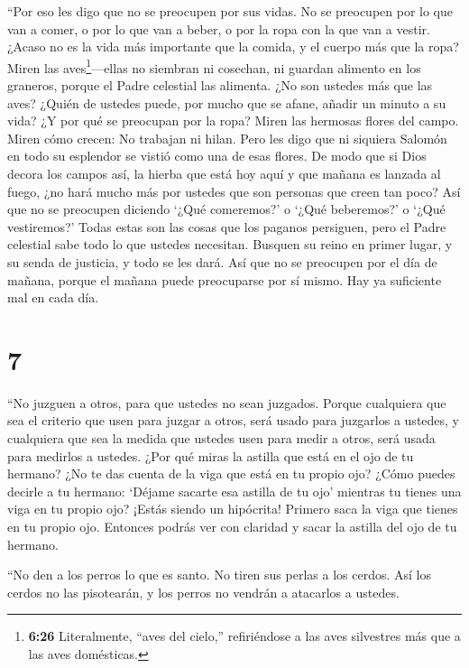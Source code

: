  ``Por eso les digo que no se preocupen por sus vidas. No
se preocupen por lo que van a comer, o por lo que van a beber, o por la
ropa con la que van a vestir. ¿Acaso no es la vida más importante que la
comida, y el cuerpo más que la ropa?  Miren las
aves\footnote{\textbf{6:26} Literalmente, ``aves del cielo,''
  refiriéndose a las aves silvestres más que a las aves domésticas.}---ellas
no siembran ni cosechan, ni guardan alimento en los graneros, porque el
Padre celestial las alimenta. ¿No son ustedes más que las aves?
 ¿Quién de ustedes puede, por mucho que se afane, añadir un
minuto a su vida?  ¿Y por qué se preocupan por la ropa?
Miren las hermosas flores del campo. Miren cómo crecen: No trabajan ni
hilan.  Pero les digo que ni siquiera Salomón en todo su
esplendor se vistió como una de esas flores.  De modo que
si Dios decora los campos así, la hierba que está hoy aquí y que mañana
es lanzada al fuego, ¿no hará mucho más por ustedes que son personas que
creen tan poco?  Así que no se preocupen diciendo `¿Qué
comeremos?' o `¿Qué beberemos?' o `¿Qué vestiremos?'  Todas
estas son las cosas que los paganos persiguen, pero el Padre celestial
sabe todo lo que ustedes necesitan.  Busquen su reino en
primer lugar, y su senda de justicia, y todo se les dará. 
Así que no se preocupen por el día de mañana, porque el mañana puede
preocuparse por sí mismo. Hay ya suficiente mal en cada día.

\hypertarget{section-6}{%
\section{7}\label{section-6}}

 ``No juzguen a otros, para que ustedes no sean juzgados.
 Porque cualquiera que sea el criterio que usen para juzgar
a otros, será usado para juzgarlos a ustedes, y cualquiera que sea la
medida que ustedes usen para medir a otros, será usada para medirlos a
ustedes.  ¿Por qué miras la astilla que está en el ojo de tu
hermano? ¿No te das cuenta de la viga que está en tu propio ojo?
 ¿Cómo puedes decirle a tu hermano: `Déjame sacarte esa
astilla de tu ojo' mientras tu tienes una viga en tu propio ojo?
 ¡Estás siendo un hipócrita! Primero saca la viga que tienes
en tu propio ojo. Entonces podrás ver con claridad y sacar la astilla
del ojo de tu hermano.

 ``No den a los perros lo que es santo. No tiren sus perlas
a los cerdos. Así los cerdos no las pisotearán, y los perros no vendrán
a atacarlos a ustedes.

